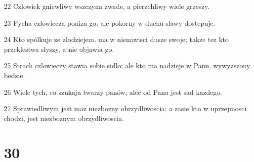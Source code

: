 \par 22 Czlowiek gniewliwy wszczyna zwade, a pierzchliwy wiele grzeszy.
\par 23 Pycha czlowiecza poniza go; ale pokorny w duchu slawy dostepuje.
\par 24 Kto spólkuje ze zlodziejem, ma w nienawisci dusze swoje; takze tez kto przeklestwa slyszy, a nie objawia go.
\par 25 Strach czlowieczy stawia sobie sidlo; ale kto ma nadzieje w Panu, wywyzszony bedzie.
\par 26 Wiele tych, co szukaja twarzy panów; alec od Pana jest sad kazdego.
\par 27 Sprawiedliwym jest maz niezbozny obrzydliwoscia; a zasie kto w uprzejmosci chodzi, jest niezboznym obrzydliwoscia.

\chapter{30}

